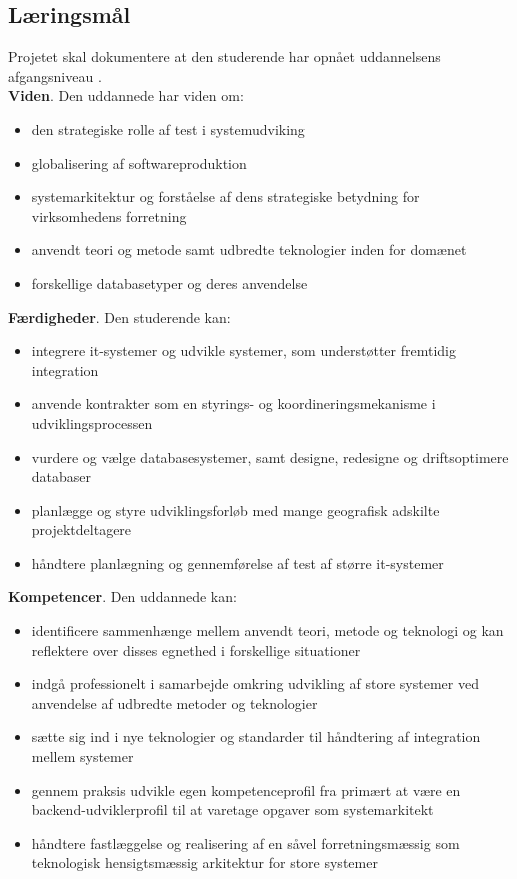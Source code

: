 \documentclass[a4paper]{article}
\begin{document}
\subsection{Læringsmål}
Projetet skal dokumentere at den studerende har opnået uddannelsens afgangsniveau \cite[sektion 5.4]{studieordning}.\\
\textbf{Viden}. Den uddannede har viden om:
\begin{itemize}
\item den strategiske rolle af test i systemudviking
\item globalisering af softwareproduktion
\item systemarkitektur og forståelse af dens strategiske betydning for virksomhedens forretning
\item anvendt teori og metode samt udbredte teknologier inden for domænet
\item forskellige databasetyper og deres anvendelse
\end{itemize}
\textbf{Færdigheder}. Den studerende kan:
\begin{itemize}
\item integrere it-systemer og udvikle systemer, som understøtter fremtidig integration
\item anvende kontrakter som en styrings- og koordineringsmekanisme i udviklingsprocessen
\item vurdere og vælge databasesystemer, samt designe, redesigne og driftsoptimere databaser
\item planlægge og styre udviklingsforløb med mange geografisk adskilte projektdeltagere
\item håndtere planlægning og gennemførelse af test af større it-systemer
\end{itemize}
\textbf{Kompetencer}. Den uddannede kan:
\begin{itemize}
\item identificere sammenhænge mellem anvendt teori, metode og teknologi og kan reflektere over disses egnethed i forskellige situationer
\item indgå professionelt i samarbejde omkring udvikling af store systemer ved anvendelse af udbredte metoder og teknologier
\item sætte sig ind i nye teknologier og standarder til håndtering af integration mellem systemer
\item gennem praksis udvikle egen kompetenceprofil fra primært at være en backend-udviklerprofil til at varetage opgaver som systemarkitekt
\item håndtere fastlæggelse og realisering af en såvel forretningsmæssig som teknologisk hensigtsmæssig arkitektur for store systemer
\end{itemize}
\end{document}
